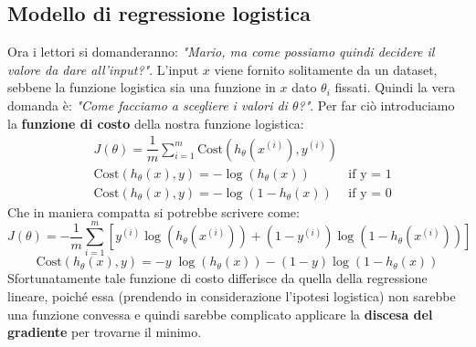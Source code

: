 \subsection{Modello di regressione logistica}
Ora i lettori si domanderanno: \textit{"Mario, ma come possiamo quindi decidere il valore da dare all'input?"}. L'input $x$ viene fornito solitamente da un dataset, sebbene la funzione logistica sia una funzione in $x$ dato $\theta_i$ fissati. Quindi la vera domanda è:\textit{ "Come facciamo a scegliere i valori di $\theta$?"}. Per far ciò introduciamo la \textbf{funzione di costo} della nostra funzione logistica:
\begin{align*}& J(\theta) = \dfrac{1}{m} \sum_{i=1}^m \mathrm{Cost}(h_\theta(x^{(i)}),y^{(i)}) \\ & \mathrm{Cost}(h_\theta(x),y) = -\log(h_\theta(x)) \; & \text{if y = 1} \\ & \mathrm{Cost}(h_\theta(x),y) = -\log(1-h_\theta(x)) \; & \text{if y = 0}\end{align*}
Che in maniera compatta si potrebbe scrivere come:
\[J(\theta) = - \frac{1}{m} \displaystyle \sum_{i=1}^m [y^{(i)}\log (h_\theta (x^{(i)})) + (1 - y^{(i)})\log (1 - h_\theta(x^{(i)}))]\]
\[\mathrm{Cost}(h_\theta(x),y) = - y \; \log(h_\theta(x)) - (1 - y) \log(1 - h_\theta(x))\]
Sfortunatamente tale funzione di costo differisce da quella della regressione lineare, poiché essa (prendendo in considerazione l'ipotesi logistica) non sarebbe una funzione convessa e quindi sarebbe complicato applicare la \textbf{discesa del gradiente} per trovarne il minimo.\\
